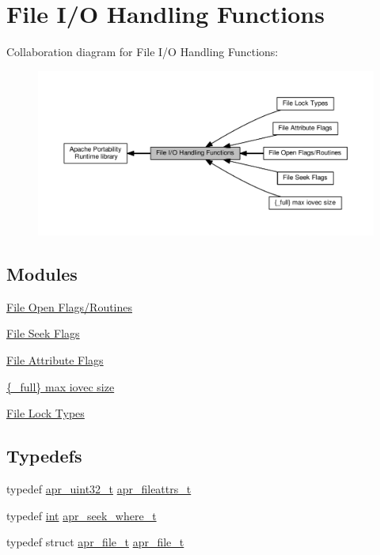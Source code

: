 \hypertarget{group__apr__file__io}{}\section{File I/O Handling Functions}
\label{group__apr__file__io}
Collaboration diagram for File I/O Handling Functions\+:
\nopagebreak
\begin{figure}[H]
\begin{center}
\leavevmode
\includegraphics[width=350pt]{group__apr__file__io}
\end{center}
\end{figure}
\subsection*{Modules}
\begin{DoxyCompactItemize}
\item 
\hyperlink{group__apr__file__open__flags}{File Open Flags/\+Routines}
\item 
\hyperlink{group__apr__file__seek__flags}{File Seek Flags}
\item 
\hyperlink{group__apr__file__attrs__set__flags}{File Attribute Flags}
\item 
\hyperlink{group__apr__file__writev}{\{\+\_\+full\} max iovec size}
\item 
\hyperlink{group__apr__file__lock__types}{File Lock Types}
\end{DoxyCompactItemize}
\subsection*{Typedefs}
\begin{DoxyCompactItemize}
\item 
typedef \hyperlink{group__apr__platform_ga558548a135d8a816c4787250744ea147}{apr\+\_\+uint32\+\_\+t} \hyperlink{group__apr__file__io_ga11fbee5a7a3f3d45fff5c31df0db9737}{apr\+\_\+fileattrs\+\_\+t}
\item 
typedef \hyperlink{pcre_8txt_a42dfa4ff673c82d8efe7144098fbc198}{int} \hyperlink{group__apr__file__io_ga8eecd44975906042e0e369771802a145}{apr\+\_\+seek\+\_\+where\+\_\+t}
\item 
typedef struct \hyperlink{structapr__file__t}{apr\+\_\+file\+\_\+t} \hyperlink{group__apr__file__io_gaa46e4763ac375ea3c7a43ba6f6099e22}{apr\+\_\+file\+\_\+t}
\end{DoxyCompactItemize}

